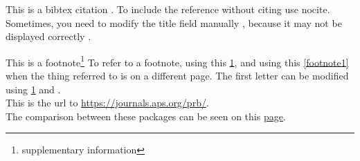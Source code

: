 \documentclass{article}
\begin{document}
This is a bibtex citation \cite{PhysRevB.78.104104}.
To include the reference without citing use nocite. \nocite{PhysRevLett.99.077601}
Sometimes, you need to modify the title field manually \cite{PhysRevB.82.134106_original}, because it may not be displayed correctly \cite{PhysRevB.82.134106_modified}. 

This is a footnote\footnote{\label{footnote1}supplementary information}
\newpage
To refer to a footnote, using this \ref{footnote1}, and using this \vref{footnote1} when the thing referred to is on a different page. The first letter can be modified using \cref{footnote1} and . \\
This is the url to \url{https://journals.aps.org/prb/}. \\
The comparison between these packages can be seen on this \href{https://tex.stackexchange.com/questions/83037/difference-between-ref-varioref-and-cleveref-decision-for-a-thesis}{page}.


% 
% 
\printindex
\end{document}

